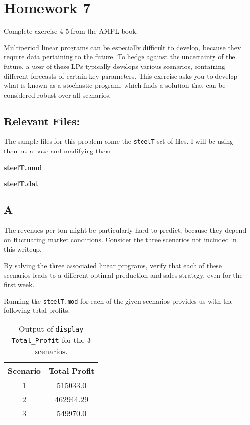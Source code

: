 \section*{Homework 7}

Complete exercise 4-5 from the AMPL book.

Multiperiod linear programs can be especially difficult to develop, because they require data pertaining to the future. To hedge against the uncertainty of the future, a user of these LPs typically develops various scenarios, containing different forecasts of certain key parameters. This exercise asks you to develop what is known as a stochastic program, which finds a solution that can be considered robust over all scenarios.

\subsection*{Relevant Files:}

The sample files for this problem come the \texttt{steelT} set of files. I will be using them as a base and modifying them. 

\noindent\textbf{steelT.mod}



\noindent\textbf{steelT.dat}



\subsection*{A}

\prob

The revenues per ton might be particularly hard to predict, because they depend on fluctuating market conditions. Consider the three scenarios not included in this writeup.

By solving the three associated linear programs, verify that each of these scenarios leads to a different optimal production and sales strategy, even for the first week.

\sol

Running the \texttt{steelT.mod} for each of the given scenarios provides us with the following total profits:

\begin{table}[!ht]
	\centering
	\begin{tabular}{|c|c|}
		\hline
		Scenario & Total Profit \\
		\hline
		1 & 515033.0 \\
		2 & 462944.29 \\
		3 & 549970.0 \\
		\hline
	\end{tabular}
	\caption{Output of \texttt{display Total\_Profit} for the 3 scenarios.}
	\label{tab:<+label+>}
\end{table}

